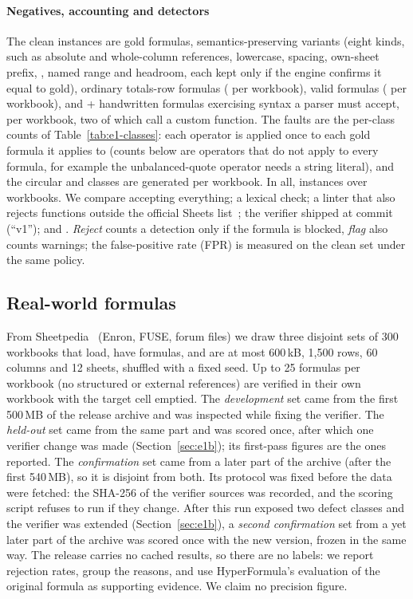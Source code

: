 \paragraph{Negatives, accounting and detectors}
The \nBenchClean{} clean instances are \accGold{} gold formulas, \accVariants{} semantics-preserving variants (eight kinds, such as absolute and whole-column references, lowercase, spacing, own-sheet prefix, , named range and headroom, each kept only if the engine confirms it equal to gold), \accTotals{} ordinary totals-row formulas (\accCircPerWb{} per workbook), \accQuery{} valid  formulas (\accQueryPerWb{} per workbook), and \accExtra{} + \accCustom{} handwritten formulas exercising syntax a parser must accept, \accHandPerWb{} per workbook, two of which call a custom function. The \nBenchFaults{} faults are the per-class counts of Table~\ref{tab:e1-classes}: each operator is applied once to each gold formula it applies to (counts below \accGold{} are operators that do not apply to every formula, for example the unbalanced-quote operator needs a string literal), and the circular and  classes are generated per workbook. In all, \nBenchTotal{} instances over \nBenchWorkbooks{} workbooks. We compare accepting everything; a lexical check; a linter that also rejects functions outside the official Sheets list~\cite{googlefunctions}; the verifier shipped at commit  (``v1''); and \gc. \emph{Reject} counts a detection only if the formula is blocked, \emph{flag} also counts warnings; the false-positive rate (FPR) is measured on the clean set under the same policy.

\subsection{Real-world formulas}
\label{sec:rwmethod}
From Sheetpedia~\cite{tian2025sheetpedia} (Enron, FUSE, forum files) we draw three disjoint sets of 300 workbooks that load, have formulas, and are at most 600\,kB, 1{,}500 rows, 60 columns and 12 sheets, shuffled with a fixed seed. Up to 25 formulas per workbook (no structured or external references) are verified in their own workbook with the target cell emptied. The \emph{development} set came from the first 500\,MB of the release archive and was inspected while fixing the verifier. The \emph{held-out} set came from the same part and was scored once, after which one verifier change was made (Section~\ref{sec:e1b}); its first-pass figures are the ones reported. The \emph{confirmation} set came from a later part of the archive (after the first 540\,MB), so it is disjoint from both. Its protocol was fixed before the data were fetched: the SHA-256 of the verifier sources was recorded, and the scoring script refuses to run if they change. \ifdefined\rwcGFormulas After this run exposed two defect classes and the verifier was extended (Section~\ref{sec:e1b}), a \emph{second confirmation} set from a yet later part of the archive was scored once with the new version, frozen in the same way.\fi{} The release carries no cached results, so there are no labels: we report rejection rates, group the reasons, and use HyperFormula's evaluation of the original formula as supporting evidence. We claim no precision figure.

